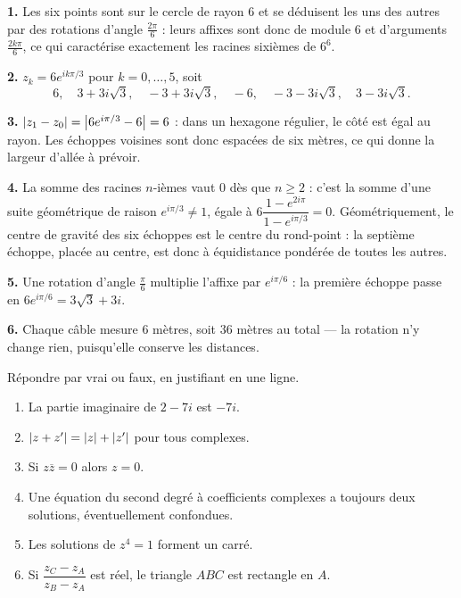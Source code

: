 \begin{corrige}
\textbf{1.} Les six points sont sur le cercle de rayon $6$ et se déduisent
les uns des autres par des rotations d'angle $\frac{2\pi}{6}$ : leurs affixes
sont donc de module $6$ et d'arguments $\frac{2k\pi}{6}$, ce qui caractérise
exactement les racines sixièmes de $6^{6}$.

\textbf{2.} $z_{k} = 6e^{ik\pi/3}$ pour $k = 0,\dots,5$, soit
\[
  6, \quad 3+3i\sqrt3, \quad -3+3i\sqrt3, \quad -6, \quad -3-3i\sqrt3,
  \quad 3-3i\sqrt3 .
\]

\textbf{3.} $\left|z_{1}-z_{0}\right| = \left|6e^{i\pi/3}-6\right| = 6$ : dans un hexagone
régulier, le côté est égal au rayon. Les échoppes voisines sont donc
espacées de six mètres, ce qui donne la largeur d'allée à prévoir.

\textbf{4.} La somme des racines $n$-ièmes vaut $0$ dès que $n \geq 2$ :
c'est la somme d'une suite géométrique de raison $e^{i\pi/3} \neq 1$, égale à
$6\dfrac{1-e^{2i\pi}}{1-e^{i\pi/3}} = 0$. Géométriquement, le centre de
gravité des six échoppes est le centre du rond-point : la septième échoppe,
placée au centre, est donc à équidistance pondérée de toutes les autres.

\textbf{5.} Une rotation d'angle $\frac{\pi}{6}$ multiplie l'affixe par
$e^{i\pi/6}$ : la première échoppe passe en $6e^{i\pi/6}
= 3\sqrt3+3i$.

\textbf{6.} Chaque câble mesure $6$ mètres, soit $36$ mètres au total —
la rotation n'y change rien, puisqu'elle conserve les distances.
\end{corrige}

\begin{jemeteste}
Répondre par vrai ou faux, en justifiant en une ligne.

\begin{enumerate}[label=\textbf{\arabic*.}, leftmargin=*, itemsep=0.28em]
  \item La partie imaginaire de $2-7i$ est $-7i$.
  \item $\left|z+z'\right| = \left|z\right|+\left|z'\right|$ pour tous complexes.
  \item Si $z\overline z = 0$ alors $z = 0$.
  \item Une équation du second degré à coefficients complexes a toujours deux
        solutions, éventuellement confondues.
  \item Les solutions de $z^{4} = 1$ forment un carré.
  \item Si $\dfrac{z_{C}-z_{A}}{z_{B}-z_{A}}$ est réel, le triangle $ABC$ est
        rectangle en $A$.
\end{enumerate}
\end{jemeteste}

